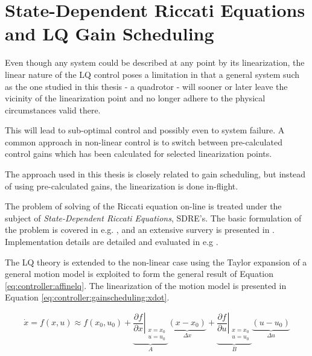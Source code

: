 \section{State-Dependent Riccati Equations and LQ Gain Scheduling}
\label{sec:controller:gainscheduling}
    Even though any system could be described at any point by its linearization,
    the linear nature of the LQ control poses a limitation in that
    a general system such as the one studied in this thesis - a quadrotor - will
    sooner or later leave the vicinity of the linearization point and no
    longer adhere to the physical circumstances valid there.

    This will lead to sub-optimal control and possibly even to system failure.
    A common approach in non-linear control is to switch between pre-calculated
    control gains which has been calculated for selected linearization points.

    The approach used in this thesis is closely related to gain scheduling,
    but instead of using pre-calculated gains, the linearization is done
    in-flight.

    The problem of solving of the Riccati equation  on-line is treated under
    the subject of \textit{State-Dependent Riccati Equations}, SDRE's.
    The basic formulation of the problem is covered in e.g. \citep{Rantzer99piecewiselinear},
    and an extensive survery is presented in \citep{Tayfun08sdresurvey}.
    Implementation details are detailed and evaluated in e.g \citep{Erdem_analysisand,Benner98acceleratingnewton's,10.1109/MED.2006.328740}.

    The LQ theory is extended to the non-linear case using the Taylor
    expansion of a general motion model is exploited to form the general
    result of Equation \eqref{eq:controller:affinelq}.
    The linearization of the motion model is presented in
    Equation \eqref{eq:controller:gainscheduling:xdot}.

    \begin{equation}
        \label{eq:controller:gainscheduling:xdot}
        \dot{x} = f(x,u) \approx f(x_{0},u_{0})
            + \underbrace{\left. \frac{\partial f}{\partial x} \right|_{
                \begin{array}{l}
                    x=x_{0} \\
                    u=u_{0}
                \end{array}
            }}_{A}
                \underbrace{\left( x-x_{0} \right)}_{\Delta x}
            + \underbrace{\left. \frac{\partial f}{\partial u} \right|_{
                \begin{array}{l}
                    x=x_{0} \\
                    u=u_{0}
                \end{array}
            }}_{B}
                \underbrace{\left( u-u_{0} \right)}_{\Delta u}
    \end{equation}

